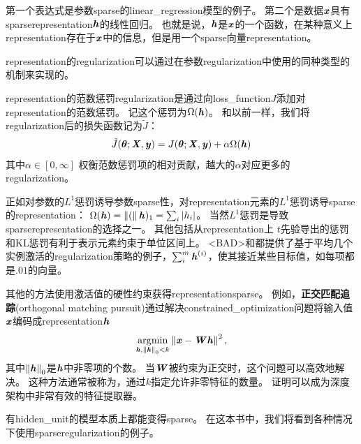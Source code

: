 
第一个表达式是参数\gls{sparse}的\gls{linear_regression}模型的例子。
第二个是数据$\boldsymbol{\mathit{x}}$具有\gls{sparse}\gls{representation}$\boldsymbol{\mathit{h}}$的线性回归。
也就是说，$\boldsymbol{\mathit{h}}$是$\boldsymbol{\mathit{x}}$的一个函数，在某种意义上\gls{representation}存在于$\boldsymbol{\mathit{x}}$中的信息，但是用一个\gls{sparse}向量\gls{representation}。

\gls{representation}的\gls{regularization}可以通过在参数\gls{regularization}中使用的同种类型的机制来实现的。

\gls{representation}的范数惩罚\gls{regularization}是通过向\gls{loss_function}$J$添加对\gls{representation}的范数惩罚。
记这个惩罚为$\Omega(\boldsymbol{\mathit{h}})$。
和以前一样，我们将\gls{regularization}后的损失函数记为$\tilde J$：
\begin{align}
 \tilde J(\boldsymbol{\theta}; \boldsymbol{\mathit{X}}, \boldsymbol{\mathit{y}}) =  J(\boldsymbol{\theta}; \boldsymbol{\mathit{X}}, \boldsymbol{\mathit{y}})  + \alpha \Omega(\boldsymbol{\mathit{h}})
\end{align}
其中$\alpha \in [0, \infty]$ 权衡范数惩罚项的相对贡献，越大的$\alpha$对应更多的\gls{regularization}。

正如对参数的$L^1$惩罚诱导参数\gls{sparse}性，对\gls{representation}元素的$L^1$惩罚诱导\gls{sparse}的\gls{representation}：
$\Omega(\boldsymbol{\mathit{h}}) = \left\lVert(\right\rVert\boldsymbol{\mathit{h}})_1 = \sum_i |h_i|$。
当然$L^1$惩罚是导致\gls{sparse}\gls{representation}的选择之一。
其他包括从\gls{representation}上 $t$先验导出的惩罚\citep{Olshausen+Field-1996,Bergstra-Phd-2011}和\gls{KL}惩罚\citep{Larochelle+Bengio-2008}有利于表示元素约束于单位区间上。
<BAD>\cite{HonglakL2008-small}和\cite{Goodfellow2009}都提供了基于平均几个实例激活的\gls{regularization}策略的例子，$\sum_i^m \boldsymbol{\mathit{h}}^{(i)}$，使其接近某些目标值，如每项都是$.01$的向量。

其他的方法使用激活值的硬性约束获得\gls{representation}\gls{sparse}。
例如，\textbf{正交匹配追踪}(orthogonal matching pursuit)\citep{pati93orthogonal}通过解决\gls{constrained_optimization}问题将输入值$\boldsymbol{\mathit{x}}$编码成\gls{representation}$\boldsymbol{\mathit{h}}$
\begin{align}
 \underset{\boldsymbol{\mathit{h}}, \left\lVert\boldsymbol{\mathit{h}}\right\rVert_0 < k}{\arg\!\min} \left\lVert\boldsymbol{\mathit{x}} - \boldsymbol{\mathit{W}} \boldsymbol{\mathit{h}}\right\rVert^2,
\end{align}
其中$\left\lVert\boldsymbol{\mathit{h}}\right\rVert_0 $是$\boldsymbol{\mathit{h}}$中非零项的个数。
当$\boldsymbol{\mathit{W}}$被约束为正交时，这个问题可以高效地解决。
这种方法通常被称为，通过$k$指定允许非零特征的数量。
\cite{Coates2011b}证明可以成为深度架构中非常有效的特征提取器。


有\gls{hidden_unit}的模型本质上都能变得\gls{sparse}。
在这本书中，我们将看到各种情况下使用\gls{sparse}\gls{regularization}的例子。

